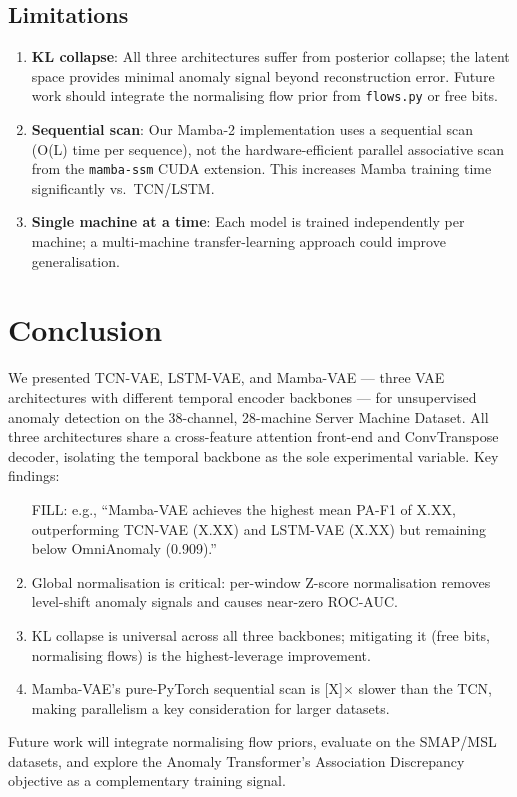 \documentclass[10pt,twocolumn]{article}
\begin{document}
\subsection{Limitations}

\begin{enumerate}
  \item \textbf{KL collapse}: All three architectures suffer from posterior
        collapse; the latent space provides minimal anomaly signal beyond
        reconstruction error. Future work should integrate the normalising flow
        prior from \texttt{flows.py} or free bits.
  \item \textbf{Sequential scan}: Our Mamba-2 implementation uses a sequential
        scan (O(L) time per sequence), not the hardware-efficient parallel
        associative scan from the \texttt{mamba-ssm} CUDA extension.
        This increases Mamba training time significantly vs.\  TCN/LSTM.
  \item \textbf{Single machine at a time}: Each model is trained independently
        per machine; a multi-machine transfer-learning approach could improve
        generalisation.
\end{enumerate}


\section{Conclusion}

We presented TCN-VAE, LSTM-VAE, and Mamba-VAE — three VAE architectures with
different temporal encoder backbones — for unsupervised anomaly detection on
the 38-channel, 28-machine Server Machine Dataset. All three architectures share
a cross-feature attention front-end and ConvTranspose decoder, isolating the
temporal backbone as the sole experimental variable. Key findings:

\begin{enumerate}
  \item [FILL: e.g., ``Mamba-VAE achieves the highest mean PA-F1 of X.XX,
        outperforming TCN-VAE (X.XX) and LSTM-VAE (X.XX) but remaining below
        OmniAnomaly (0.909).'']
  \item Global normalisation is critical: per-window Z-score normalisation
        removes level-shift anomaly signals and causes near-zero ROC-AUC.
  \item KL collapse is universal across all three backbones; mitigating it
        (free bits, normalising flows) is the highest-leverage improvement.
  \item Mamba-VAE's pure-PyTorch sequential scan is [X]$\times$ slower than
        the TCN, making parallelism a key consideration for larger datasets.
\end{enumerate}

Future work will integrate normalising flow priors, evaluate on the SMAP/MSL
datasets, and explore the Anomaly Transformer's Association Discrepancy
objective as a complementary training signal.




\end{document}
